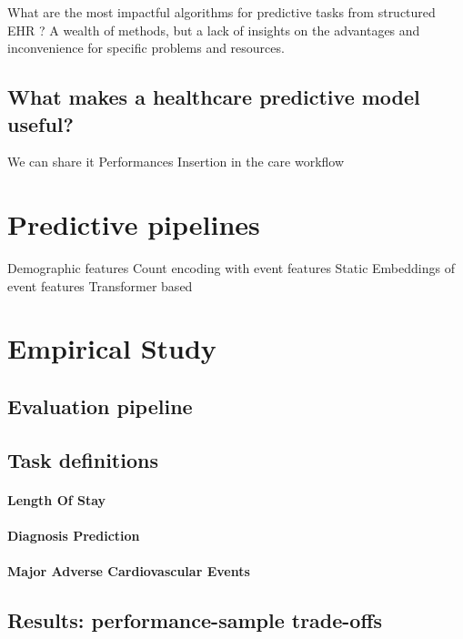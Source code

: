 \documentclass{report}
\begin{document}
What are the most impactful algorithms for predictive tasks from structured EHR ?
A wealth of methods, but a lack of insights on the advantages and inconvenience for specific problems and resources.

\subsection{What makes a healthcare predictive model useful?}\label{subsec:predictive_models:useful}

We can share it
Performances
Insertion in the care workflow


\section{Predictive pipelines}\label{sec:predictive_models:pipelines}

Demographic features
Count encoding with event features
Static Embeddings of event features
Transformer based
\section{Empirical Study}\label{sec:predictive_models:empirical_study}
\subsection{Evaluation pipeline}\label{subsec:predictive_models:evaluation_pipeline}
\subsection{Task definitions}\label{subsec:predictive_models:task_definitions}

\paragraph{Length Of Stay}
\paragraph{Diagnosis Prediction}
\paragraph{Major Adverse Cardiovascular Events}
\subsection{Results: performance-sample trade-offs}
\end{document}

